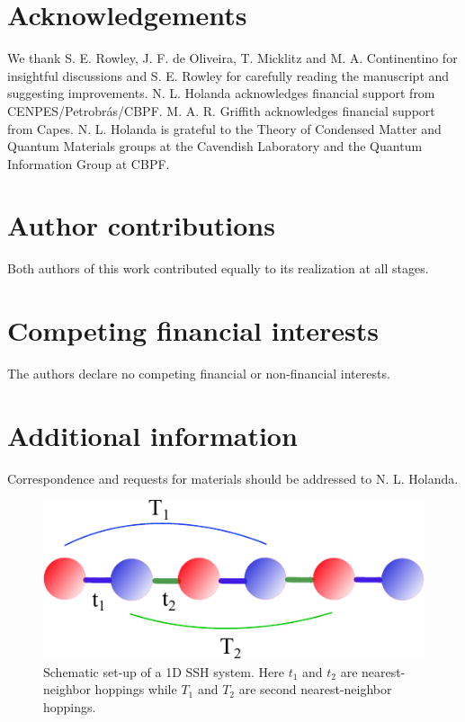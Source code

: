 \documentclass[fleqn,10pt]{wlscirep}
\begin{document}
\section*{Acknowledgements}

We thank S. E. Rowley, J. F. de Oliveira, T. Micklitz and M. A. Continentino for insightful discussions and S. E. Rowley for carefully reading the manuscript and suggesting improvements. N. L. Holanda acknowledges financial support from CENPES/Petrobr\'as/CBPF. M. A. R. Griffith acknowledges financial support from Capes. N. L. Holanda is grateful to the Theory of Condensed Matter and Quantum Materials groups at the Cavendish Laboratory and the Quantum Information Group at CBPF.


\section*{Author contributions}

Both authors of this work contributed equally to its realization at all stages.

\section*{Competing financial interests}

The authors declare no competing financial or non-financial interests.

\section*{Additional information}

Correspondence and requests for materials should be addressed to N. L. Holanda.




\newpage

\begin{figure}
  \centering
  \includegraphics[width=.37\textwidth]{./phase_diagrams/ssh_model.pdf}
  \caption{Schematic set-up of a 1D SSH system. Here $t_1$ and $t_2$ are nearest-neighbor hoppings while $T_1$ and $T_2$ are second nearest-neighbor hoppings.}
\label{fig:model}
\end{figure}
\end{document}
